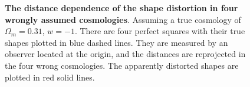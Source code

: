 \documentclass{natureprintstyle}
\begin{document}
\begin{figure}[tb]
   \vspace{-2mm}
   \caption{\label{fig_xy}
   {\bf The distance dependence of the shape distortion in four wrongly assumed cosmologies}.
   Assuming a true cosmology of $\Omega_m=0.31$, $w=-1$.
   There are four perfect squares with their true shapes plotted in blue dashed lines.
   They are measured by an observer located at the origin, and the distances are reprojected in the four wrong cosmologies.
   The apparently distorted shapes are plotted in red solid lines.
   }
   \vspace{-4mm}
\end{figure}
\end{document}
